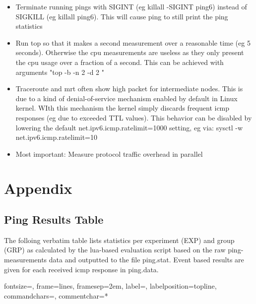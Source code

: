 \documentclass[a4paper,12pt,twoside]{article}
\begin{document}
\begin{itemize}

\item Terminate running pings with SIGINT (eg killall -SIGINT ping6) instead of SIGKILL (eg killall ping6). This will cause ping to still print the ping statistics

\item Run top so that it makes a second measurement over a reasonable time (eg 5 seconds). Otherwise the cpu measurements are useless as they only present the cpu usage over a fraction of a second. This can be achieved with arguments "top -b -n 2 -d 2 "

\item Traceroute and mrt often show  high packet for intermediate nodes. This is due to a kind of denial-of-service mechanism enabled by default in Linux kernel. WIth this mechanism the kernel simply discards frequent icmp responses (eg due to exceeded TTL values). This behavior can be disabled by lowering the default net.ipv6.icmp.ratelimit=1000 setting, eg via: sysctl -w net.ipv6.icmp.ratelimit=10

\item Most important: Measure protocol traffic overhead in parallel
\end{itemize}


\section{Appendix}

\subsection{Ping Results Table}

The folloing verbatim table lists statistics per experiment (EXP) and group (GRP) as calculated by the lua-based
evaluation script based on the raw ping-measurements data and outputted to the file ping.stat.
Event based results are given for each received icmp response in ping.data.

{}%
{fontsize=\tiny,
 frame=lines,  %
 framesep=2em, %
 label=,
 labelposition=topline,
 commandchars=\|\(\), %
 commentchar=*        %
}
\end{document}
